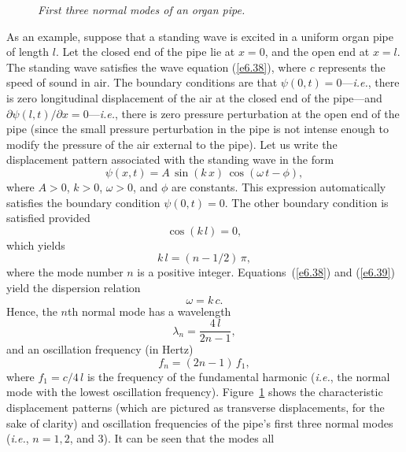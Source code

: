 \begin{figure}
\epsfysize=2.5in
\centerline{}
\caption{\em First three normal modes of an organ pipe.}\label{f6.5}   
\end{figure}

As an example, suppose that a standing wave is excited in a uniform organ pipe of length $l$.
Let the closed end of the pipe lie at $x=0$, and the open end  at $x=l$. 
The standing wave satisfies the wave equation (\ref{e6.38}), where $c$ represents the
speed of sound in air. The boundary conditions are that $\psi(0,t)=0$---{\em i.e.}, there is
zero longitudinal  displacement of the air at the closed end of the pipe---and $\partial\psi(l,t)/\partial x=0$---{\em i.e.}, there is zero pressure perturbation at the open end of the pipe (since the small pressure perturbation in the pipe is not
intense enough to modify the pressure of the air external to the pipe). 
Let us write the displacement pattern associated with the standing wave in the form
\begin{equation}\label{e6.39}
\psi(x,t) = A\,\sin(k\,x)\,\cos(\omega\,t-\phi),
\end{equation}
where $A>0$, $k>0$, $\omega>0$, and $\phi$ are constants. 
This expression automatically satisfies the boundary condition $\psi(0,t)=0$. 
The other boundary condition is satisfied provided
\begin{equation}
\cos(k\,l)=0,
\end{equation}
which yields
\begin{equation}
k\,l = (n-1/2)\,\pi,
\end{equation}
where the mode number $n$ is a  positive integer. Equations~(\ref{e6.38}) and (\ref{e6.39}) yield the dispersion relation 
\begin{equation}
\omega = k\,c.
\end{equation}
Hence, the $n$th normal mode has a wavelength
\begin{equation}
\lambda_n =\frac{4\,l}{2n-1},
\end{equation}
and an oscillation frequency (in Hertz)
\begin{equation}
f_n = (2n-1)\,f_1,
\end{equation}
where $f_1=c/4\,l$ is the frequency of the fundamental harmonic ({\em i.e.}, the normal
mode with the lowest oscillation frequency). Figure~\ref{f6.5} shows the
characteristic displacement patterns (which are pictured as transverse displacements, for the sake
of clarity)  and oscillation frequencies of the pipe's first
three normal modes ({\em i.e.}, $n=1, 2$, and 3). It can be seen that  the modes all
